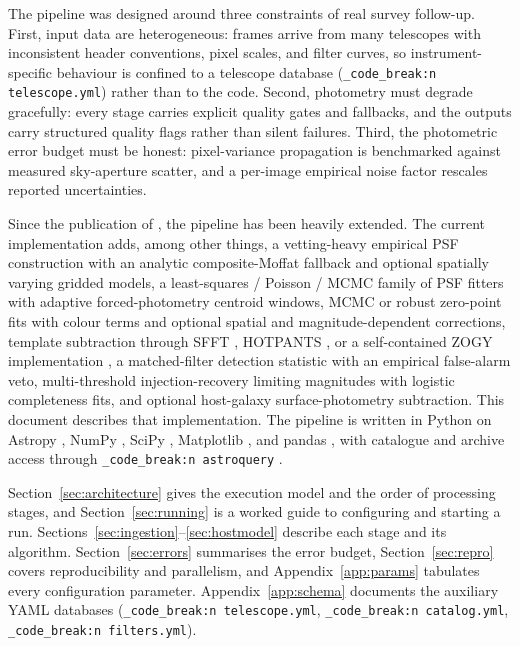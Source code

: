 \documentclass[11pt,a4paper]{article}
\renewcommand{\_}{\autophotunderscore\allowbreak}
\DeclareRobustCommand{\code}[1]{\texttt{\autophot_code_break:n {#1}}}
\begin{document}
The pipeline was designed around three constraints of real survey
follow-up. First, input data are heterogeneous: frames arrive from many
telescopes with inconsistent header conventions, pixel scales, and filter
curves, so instrument-specific behaviour is confined to a telescope
database (\code{telescope.yml}) rather than to the code. Second, photometry
must degrade gracefully: every stage carries explicit quality gates and
fallbacks, and the outputs carry structured quality flags rather than
silent failures. Third, the photometric error budget must be honest:
pixel-variance propagation is benchmarked against measured sky-aperture
scatter, and a per-image empirical noise factor rescales reported
uncertainties.

Since the publication of \citet{brennan2022autophot}, the pipeline has been
heavily extended. The current implementation adds, among other things, a
vetting-heavy empirical PSF construction with an analytic composite-Moffat
fallback and optional spatially varying gridded models, a least-squares /
Poisson / MCMC family of PSF fitters with adaptive forced-photometry
centroid windows, MCMC or robust zero-point fits with colour terms and
optional spatial and magnitude-dependent corrections, template subtraction
through SFFT \citep{russell2022sfft,hu2022sfft}, HOTPANTS
\citep{becker2015hotpants}, or a self-contained ZOGY implementation
\citep{zackay2016proper}, a matched-filter detection statistic with an
empirical false-alarm veto, multi-threshold injection-recovery limiting
magnitudes with logistic completeness fits, and optional host-galaxy
surface-photometry subtraction. This document describes that
implementation. The pipeline is written in Python on Astropy
\citep{astropy2022}, NumPy \citep{harris2020numpy}, SciPy
\citep{virtanen2020scipy}, Matplotlib \citep{hunter2007matplotlib}, and
pandas \citep{mckinney2010pandas}, with catalogue and archive access
through \code{astroquery} \citep{ginsburg2019astroquery}.

Section~\ref{sec:architecture} gives the execution model and the order of
processing stages, and Section~\ref{sec:running} is a worked guide to
configuring and starting a run.
Sections~\ref{sec:ingestion}--\ref{sec:hostmodel}
describe each stage and its algorithm. Section~\ref{sec:errors} summarises
the error budget, Section~\ref{sec:repro} covers reproducibility and
parallelism, and Appendix~\ref{app:params} tabulates every configuration
parameter. Appendix~\ref{app:schema} documents the auxiliary YAML
databases (\code{telescope.yml}, \code{catalog.yml}, \code{filters.yml}).
\end{document}
